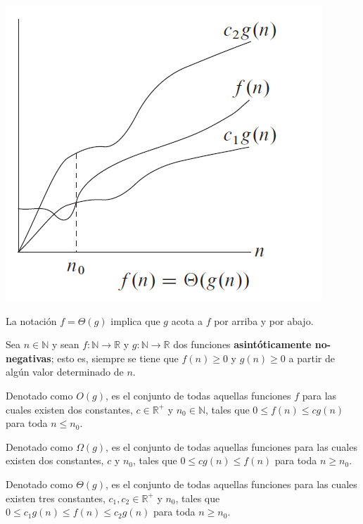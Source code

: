 \begin{marginfigure}
  \includegraphics[width=\linewidth]{figuras/big-theta}
  \caption{La notación \(f=\Theta(g)\) implica que \(g\) acota a \(f\) por arriba y por abajo.}
\end{marginfigure}

Sea \(n\in\mathbb{N}\) y sean \(f:\mathbb{N}\to\mathbb{R}\) y \(g:\mathbb{N}\to\mathbb{R}\) dos funciones \textbf{asintóticamente no-negativas}; esto es, siempre se tiene que \(f(n)\geq 0\) y \(g(n)\geq 0\) a partir de algún valor determinado de \(n\). 

\begin{defn}
  Denotado como \(O(g)\), es el conjunto de todas aquellas funciones \(f\) para las cuales existen dos constantes, \(c\in\mathbb{R}^+\) y \(n_0\in\mathbb{N}\), tales que \(0\leq f(n)\leq cg(n)\) para toda \(n\leq n_0\).
\end{defn}

\begin{defn}
  Denotado como \(\Omega(g)\), es el conjunto de todas aquellas funciones para las cuales existen dos constantes, \(c\) y \(n_0\), tales que \(0\leq cg(n)\leq f(n)\) para toda \(n\geq n_0\).
\end{defn}

\begin{defn}
  Denotado como \(\Theta(g)\), es el conjunto de todas aquellas funciones para las cuales existen tres constantes, \(c_1,c_2\in\mathbb{R}^+\) y \(n_0\), tales que \(0\leq c_1 g(n)\leq f(n)\leq c_2 g(n)\) para toda \(n\geq n_0\).
\end{defn}

